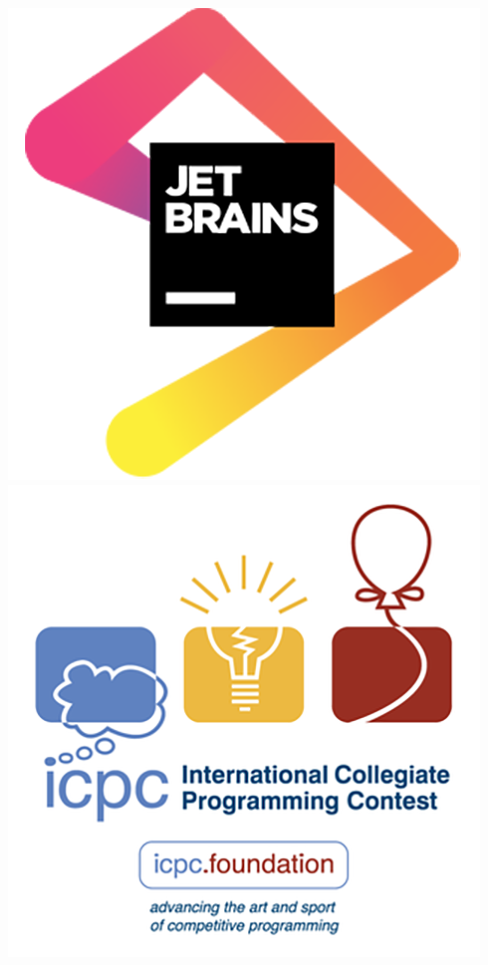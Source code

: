 \documentclass[titlepage, openany]{book}
\begin{document}
\begin{titlepage}
        \includegraphics[scale=0.4]{pictures/jetbrains.png}
        \includegraphics[scale=0.4]{pictures/icpc.png}

\end{titlepage}
\end{document}
